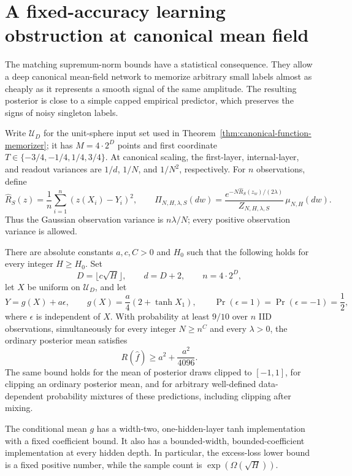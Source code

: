 \section{A fixed-accuracy learning obstruction at canonical mean field}
\label{sec:canonical-learning}
The matching supremum-norm bounds have a statistical consequence. They allow a deep canonical mean-field network to memorize arbitrary small labels almost as cheaply as it represents a smooth signal of the same amplitude. The resulting posterior is close to a simple capped empirical predictor, which preserves the signs of noisy singleton labels.

Write $\mathcal U_D$ for the unit-sphere input set used in Theorem~\ref{thm:canonical-function-memorizer}; it has $M=4\cdot2^D$ points and first coordinate $T\in\{-3/4,-1/4,1/4,3/4\}$. At canonical scaling, the first-layer, internal-layer, and readout variances are $1/d$, $1/N$, and $1/N^2$, respectively. For $n$ observations, define
\[
 \widehat R_S(z)=\frac1n\sum_{i=1}^n(z(X_i)-Y_i)^2,
 \qquad
 \Pi_{N,H,\lambda,S}(dw)=\frac{e^{-N\widehat R_S(z_w)/(2\lambda)}}{Z_{N,H,\lambda,S}}\,\mu_{N,H}(dw).
\]
Thus the Gaussian observation variance is $n\lambda/N$; every positive observation variance is allowed.

\begin{theorem}
\label{thm:canonical-learning}
There are absolute constants $a,c,C>0$ and $H_0$ such that the following holds for every integer $H\ge H_0$. Set
\[
 D=\lfloor c\sqrt H\rfloor,\qquad d=D+2,\qquad n=4\cdot2^D,
\]
let $X$ be uniform on $\mathcal U_D$, and let
\[
 Y=g(X)+a\epsilon,\qquad
 g(X)=\frac a4(2+\tanh X_1),\qquad
 \Pr(\epsilon=1)=\Pr(\epsilon=-1)=\frac12,
\]
where $\epsilon$ is independent of $X$. With probability at least $9/10$ over $n$ IID observations, simultaneously for every integer $N\ge n^C$ and every $\lambda>0$, the ordinary posterior mean satisfies
\[
 R(\widehat f)\ge a^2+\frac{a^2}{4096}.
\]
The same bound holds for the mean of posterior draws clipped to $[-1,1]$, for clipping an ordinary posterior mean, and for arbitrary well-defined data-dependent probability mixtures of these predictions, including clipping after mixing.

The conditional mean $g$ has a width-two, one-hidden-layer tanh implementation with a fixed coefficient bound. It also has a bounded-width, bounded-coefficient implementation at every hidden depth. In particular, the excess-loss lower bound is a fixed positive number, while the sample count is $\exp(\Omega(\sqrt H))$.
\end{theorem}

